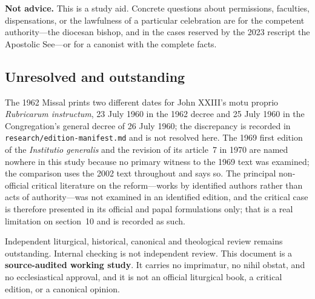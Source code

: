 \textbf{Not advice.} This is a study aid. Concrete questions about permissions, faculties, dispensations, or the lawfulness of a particular celebration are for the competent authority---the diocesan bishop, and in the cases reserved by the 2023 rescript the Apostolic See---or for a canonist with the complete facts.

\subsection*{Unresolved and outstanding}

The 1962 Missal prints two different dates for John XXIII's motu proprio \emph{Rubricarum instructum}, 23 July 1960 in the 1962 decree and 25 July 1960 in the Congregation's general decree of 26 July 1960; the discrepancy is recorded in \texttt{research/edition-manifest.md} and is not resolved here. The 1969 first edition of the \emph{Institutio generalis} and the revision of its article~7 in 1970 are named nowhere in this study because no primary witness to the 1969 text was examined; the comparison uses the 2002 text throughout and says so. The principal non-official critical literature on the reform---works by identified authors rather than acts of authority---was not examined in an identified edition, and the critical case is therefore presented in its official and papal formulations only; that is a real limitation on section~10 and is recorded as such.

Independent liturgical, historical, canonical and theological review remains outstanding. Internal checking is not independent review. This document is a \textbf{source-audited working study}. It carries no imprimatur, no nihil obstat, and no ecclesiastical approval, and it is not an official liturgical book, a critical edition, or a canonical opinion.
